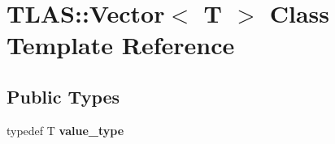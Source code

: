 \hypertarget{classTLAS_1_1Vector}{}\section{T\+L\+AS\+:\+:Vector$<$ T $>$ Class Template Reference}
\label{classTLAS_1_1Vector}
\subsection*{Public Types}
\begin{DoxyCompactItemize}
\item 
\mbox{\label{classTLAS_1_1Vector_a6dcbe6a636aa1d75263bbc1f14e85935}} 
typedef T {\bfseries value\+\_\+type}
\end{DoxyCompactItemize}
